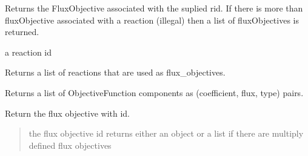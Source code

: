 \documentclass[letterpaper,12pt,english]{sphinxmanual}
\begin{document}
\begin{fulllineitems}

\begin{fulllineitems}
\label{\detokenize{api/core:cbmpy.CBModel.Objective.getFluxObjectiveForReaction}}
\pysigstartsignatures
\pysiglinewithargsret
{}
{}
{}
\pysigstopsignatures
\sphinxAtStartPar
Returns the FluxObjective associated with the suplied rid. If there is more
than fluxObjective associated with a reaction (illegal) then a list of
fluxObjectives is returned.

\sphinxAtStartPar
{} a reaction id

\end{fulllineitems}


\begin{fulllineitems}
\label{\detokenize{api/core:cbmpy.CBModel.Objective.getFluxObjectiveReactions}}
\pysigstartsignatures
\pysiglinewithargsret
{}
{}
{}
\pysigstopsignatures
\sphinxAtStartPar
Returns a list of reactions that are used as flux\_objectives.

\end{fulllineitems}


\begin{fulllineitems}
\label{\detokenize{api/core:cbmpy.CBModel.Objective.getFluxObjectiveData}}
\pysigstartsignatures
\pysiglinewithargsret
{}
{}
{}
\pysigstopsignatures
\sphinxAtStartPar
Returns a list of ObjectiveFunction components as (coefficient, flux, type)
pairs.

\end{fulllineitems}


\begin{fulllineitems}
\label{\detokenize{api/core:cbmpy.CBModel.Objective.getFluxObjective}}
\pysigstartsignatures
\pysiglinewithargsret
{}
{}
{}
\pysigstopsignatures
\sphinxAtStartPar
Return the flux objective with id.
\begin{quote}\begin{description}
\sphinxAtStartPar
{} \textendash{} the flux objective id returns either an object or a list if there are multiply defined flux objectives


\end{description}
\end{quote}
\end{fulllineitems}
\end{fulllineitems}
\end{document}
